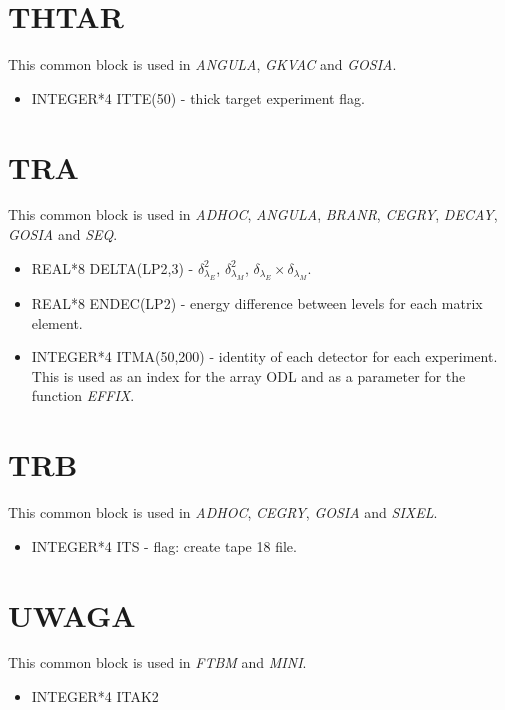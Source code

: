 \section{THTAR}

This common block is used in \emph{ANGULA}, \emph{GKVAC} and \emph{GOSIA}.

\begin{itemize}
\item INTEGER*4 ITTE(50) - thick target experiment flag.
\end{itemize}

\section{TRA}

This common block is used in \emph{ADHOC}, \emph{ANGULA}, \emph{BRANR}, \emph{
CEGRY}, \emph{DECAY}, \emph{GOSIA} and \emph{SEQ}.

\begin{itemize}
\item REAL*8 DELTA(LP2,3) - $\delta^2_{\lambda_E}$, $\delta^2_{\lambda_M}$,
$\delta_{\lambda_E}\times\delta_{\lambda_M}$.
\item REAL*8 ENDEC(LP2) - energy difference between levels for each matrix
element.
\item INTEGER*4 ITMA(50,200) - identity of each detector for each
experiment. This is used as an index for the array ODL and as a parameter
for the function \emph{EFFIX}.
\end{itemize}

\section{TRB}

This common block is used in \emph{ADHOC}, \emph{CEGRY}, \emph{GOSIA} and \emph{
SIXEL}.

\begin{itemize}
\item INTEGER*4 ITS - flag: create tape 18 file.
\end{itemize}

\section{UWAGA}

This common block is used in \emph{FTBM} and \emph{MINI}.

\begin{itemize}
\item INTEGER*4 ITAK2
\end{itemize}

